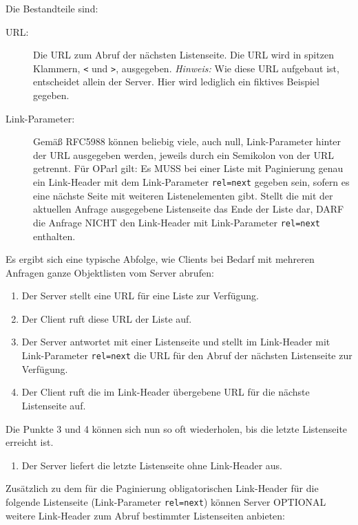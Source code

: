 \documentclass[,a4paper]{article}
\begin{document}
Die Bestandteile sind:

\begin{description}
\item[URL:]
Die URL zum Abruf der nächsten Listenseite. Die URL wird in spitzen
Klammern, \texttt{\textless{}} und \texttt{\textgreater{}}, ausgegeben.
\emph{Hinweis:} Wie diese URL aufgebaut ist, entscheidet allein der
Server. Hier wird lediglich ein fiktives Beispiel gegeben.
\item[Link-Parameter:]
Gemäß RFC5988 können beliebig viele, auch null, Link-Parameter hinter
der URL ausgegeben werden, jeweils durch ein Semikolon von der URL
getrennt. Für OParl gilt: Es MUSS bei einer Liste mit Paginierung genau
ein Link-Header mit dem Link-Parameter \texttt{rel=next} gegeben sein,
sofern es eine nächste Seite mit weiteren Listenelementen gibt. Stellt
die mit der aktuellen Anfrage ausgegebene Listenseite das Ende der Liste
dar, DARF die Anfrage NICHT den Link-Header mit Link-Parameter
\texttt{rel=next} enthalten.
\end{description}

Es ergibt sich eine typische Abfolge, wie Clients bei Bedarf mit
mehreren Anfragen ganze Objektlisten vom Server abrufen:

\begin{enumerate}
\def\labelenumi{\arabic{enumi}.}
\item
  Der Server stellt eine URL für eine Liste zur Verfügung.
\item
  Der Client ruft diese URL der Liste auf.
\item
  Der Server antwortet mit einer Listenseite und stellt im Link-Header
  mit Link-Parameter \texttt{rel=next} die URL für den Abruf der
  nächsten Listenseite zur Verfügung.
\item
  Der Client ruft die im Link-Header übergebene URL für die nächste
  Listenseite auf.
\end{enumerate}

Die Punkte 3 und 4 können sich nun so oft wiederholen, bis die letzte
Listenseite erreicht ist.

\begin{enumerate}
\def\labelenumi{\arabic{enumi}.}
\setcounter{enumi}{4}
\itemsep1pt\parskip0pt
\item
  Der Server liefert die letzte Listenseite ohne Link-Header aus.
\end{enumerate}

Zusätzlich zu dem für die Paginierung obligatorischen Link-Header für
die folgende Listenseite (Link-Parameter \texttt{rel=next}) können
Server OPTIONAL weitere Link-Header zum Abruf bestimmter Listenseiten
anbieten:
\end{document}
